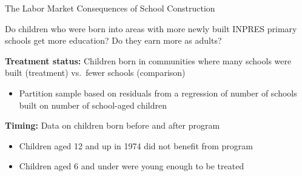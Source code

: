 \documentclass[10pt,xcolor=table,ignorenonframetext,handout,aspectratio=169]{beamer}
\newlength{\wideitemsep}
\let\olditem\item
\renewcommand{\item}{\setlength{\itemsep}{\wideitemsep}\olditem}
\begin{document}

\begin{frame}{The Labor Market Consequences of School Construction}

\medskip
Do children who were born into areas with more newly built INPRES primary schools get more education? Do they earn more as adults?

\pause
\medskip
\medskip
\textbf{Treatment status:} 
Children born in communities where many schools were built (treatment) vs.~fewer schools (comparison)

\medskip
\begin{itemize}
	
	\item Partition sample based on residuals from a regression of number of schools built on number of school-aged children
	
\end{itemize}

\pause
\medskip
\medskip
\textbf{Timing:} 
Data on children born before and after program 
	
	\medskip
	\begin{itemize}
		
		\item Children aged 12 and up in 1974 did not benefit from program
		
		\item Children aged 6 and under were young enough to be treated
		
	\end{itemize}
	

	
	

\end{frame}


\end{document}
